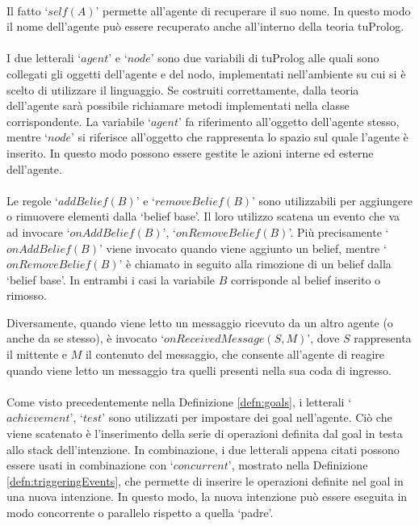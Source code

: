 \paragraph*{}
Il fatto `$self(A)$' permette all'agente di recuperare il suo nome. In questo modo il nome dell'agente può essere recuperato anche all'interno della teoria tuProlog.

\paragraph*{}
I due letterali `$agent$' e `$node$' sono due variabili di tuProlog alle quali sono collegati gli oggetti dell'agente e del nodo, implementati nell'ambiente su cui si è scelto di utilizzare il linguaggio. Se costruiti correttamente, dalla teoria dell'agente sarà possibile richiamare metodi implementati nella classe corrispondente. La variabile `$agent$' fa riferimento all'oggetto dell'agente stesso, mentre `$node$' si riferisce all'oggetto che rappresenta lo spazio sul quale l'agente è inserito. In questo modo possono essere gestite le azioni interne ed esterne dell'agente.

\paragraph*{}
Le regole `$addBelief(B)$' e `$removeBelief(B)$' sono utilizzabili per aggiungere o rimuovere elementi dalla `belief base'. Il loro utilizzo scatena un evento che va ad invocare `$onAddBelief(B)$', `$onRemoveBelief(B)$'. Più precisamente `$onAddBelief(B)$' viene invocato quando viene aggiunto un belief, mentre `$onRemoveBelief(B)$' è chiamato in seguito alla rimozione di un belief dalla `belief base'. In entrambi i casi la variabile $B$ corrisponde al belief inserito o rimosso.

Diversamente, quando viene letto un messaggio ricevuto da un altro agente (o anche da se stesso), è invocato `$onReceivedMessage(S, M)$', dove $S$ rappresenta il mittente e $M$ il contenuto del messaggio, che consente all'agente di reagire quando viene letto un messaggio tra quelli presenti nella sua coda di ingresso.

\paragraph*{}
Come visto precedentemente nella Definizione \ref{defn:goals}, i letterali `$achievement$', `$test$' sono utilizzati per impostare dei goal nell'agente. Ciò che viene scatenato è l'inserimento della serie di operazioni definita dal goal in testa allo stack dell'intenzione.
In combinazione, i due letterali appena citati possono essere usati in combinazione con `$concurrent$', mostrato nella Definizione \ref{defn:triggeringEvents}, che permette di inserire le operazioni definite nel goal in una nuova intenzione. In questo modo, la nuova intenzione può essere eseguita in modo concorrente o parallelo rispetto a quella `padre'.

